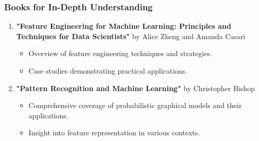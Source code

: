 \documentclass[aspectratio=169]{beamer}
\begin{document}
\begin{frame}[fragile]
    \frametitle{Books for In-Depth Understanding}
    \begin{enumerate}
        \item \textbf{"Feature Engineering for Machine Learning: Principles and Techniques for Data Scientists"} by Alice Zheng and Amanda Casari
        \begin{itemize}
            \item Overview of feature engineering techniques and strategies.
            \item Case studies demonstrating practical applications.
        \end{itemize}
        
        \item \textbf{"Pattern Recognition and Machine Learning"} by Christopher Bishop
        \begin{itemize}
            \item Comprehensive coverage of probabilistic graphical models and their applications.
            \item Insight into feature representation in various contexts.
        \end{itemize}
    \end{enumerate}
\end{frame}
\end{document}
